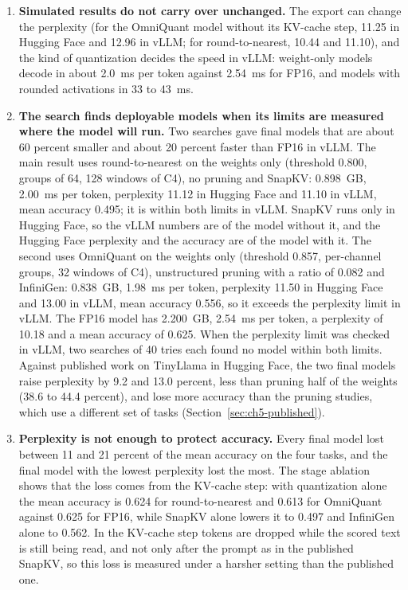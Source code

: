\documentclass[
11pt, %
english, %
singlespacing, %
headsepline, %
]{MastersDoctoralThesis} %
\begin{document}
\begin{enumerate}
  \item \textbf{Simulated results do not carry over unchanged.} The export can change the perplexity (for the OmniQuant model without its KV-cache step, 11.25 in Hugging Face and 12.96 in vLLM; for round-to-nearest, 10.44 and 11.10), and the kind of quantization decides the speed in vLLM: weight-only models decode in about 2.0~ms per token against 2.54~ms for FP16, and models with rounded activations in 33 to 43~ms.
  \item \textbf{The search finds deployable models when its limits are measured where the model will run.} Two searches gave final models that are about 60 percent smaller and about 20 percent faster than FP16 in vLLM. The main result uses round-to-nearest on the weights only (threshold 0.800, groups of 64, 128 windows of C4), no pruning and SnapKV: 0.898~GB, 2.00~ms per token, perplexity 11.12 in Hugging Face and 11.10 in vLLM, mean accuracy 0.495; it is within both limits in vLLM. SnapKV runs only in Hugging Face, so the vLLM numbers are of the model without it, and the Hugging Face perplexity and the accuracy are of the model with it. The second uses OmniQuant on the weights only (threshold 0.857, per-channel groups, 32 windows of C4), unstructured pruning with a ratio of 0.082 and InfiniGen: 0.838~GB, 1.98~ms per token, perplexity 11.50 in Hugging Face and 13.00 in vLLM, mean accuracy 0.556, so it exceeds the perplexity limit in vLLM. The FP16 model has 2.200~GB, 2.54~ms per token, a perplexity of 10.18 and a mean accuracy of 0.625. When the perplexity limit was checked in vLLM, two searches of 40 tries each found no model within both limits. Against published work on TinyLlama in Hugging Face, the two final models raise perplexity by 9.2 and 13.0 percent, less than pruning half of the weights (38.6 to 44.4 percent), and lose more accuracy than the pruning studies, which use a different set of tasks (Section~\ref{sec:ch5-published}).
  \item \textbf{Perplexity is not enough to protect accuracy.} Every final model lost between 11 and 21 percent of the mean accuracy on the four tasks, and the final model with the lowest perplexity lost the most. The stage ablation shows that the loss comes from the KV-cache step: with quantization alone the mean accuracy is 0.624 for round-to-nearest and 0.613 for OmniQuant against 0.625 for FP16, while SnapKV alone lowers it to 0.497 and InfiniGen alone to 0.562. In the KV-cache step tokens are dropped while the scored text is still being read, and not only after the prompt as in the published SnapKV, so this loss is measured under a harsher setting than the published one.
\end{enumerate}
\end{document}
